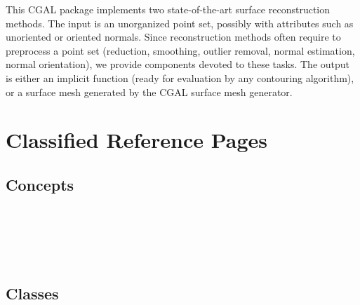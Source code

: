


This CGAL package implements two state-of-the-art surface reconstruction methods. The input is an unorganized point set, possibly with attributes such as unoriented or oriented normals. Since reconstruction methods often require to preprocess a point set (reduction, smoothing, outlier removal, normal estimation, normal orientation), we provide components devoted to these tasks. The output is either an implicit function (ready for evaluation by any contouring algorithm), or a surface mesh generated by the CGAL surface mesh generator.

\section{Classified Reference Pages}


\subsection{Concepts}

 \\
 \\
 \\
  \\


\subsection{Classes}

 \\
 \\
 \\
  \\
  \\


